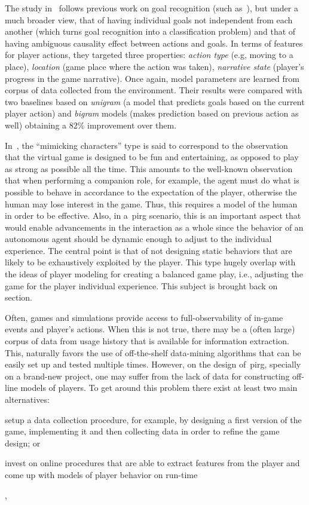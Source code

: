 The study in~\cite{ha_goal_2011} follows previous work on goal recognition (such as~\cite{mott_probabilistic_2006}), but under a much broader view, that of having individual goals not independent from each another (which turns goal recognition into a classification problem) and that of having ambiguous causality effect between actions and goals. In terms of features for player actions, they targeted three properties: \textit{action type} (e.g, moving to a place), \textit{location} (game place where the action was taken), \textit{narrative state} (player's progress in the game narrative).  Once again, model parameters are learned from corpus of data collected from the environment. Their results were compared with two baselines based on \textit{unigram} (a model that predicts goals based on the current player action) and \textit{bigram} models (makes prediction based on previous action as well) obtaining a 82\% improvement over them.

In~\cite{herik_opponent_2005}, the ``mimicking characters'' type is said to correspond to the observation that the virtual game is designed to be fun and entertaining, as opposed to play as strong as possible all the time. This amounts to the well-known observation that when performing a companion role, for example, the agent must do what is possible to behave in accordance to the expectation of the player, otherwise the human may lose interest in the game. Thus, this requires a model of the human in order to be effective. Also, in a~\gls{pirg} scenario, this is an important aspect that would enable advancements in the interaction as a whole since the behavior of an autonomous agent should be dynamic enough to adjust to the individual experience. The central point is that of not designing static behaviors that are likely to be exhaustively exploited by the player. This type hugely overlap with the ideas of player modeling for creating a balanced game play, i.e., adjusting the game for the player individual experience. This subject is brought back on section.  

Often, games and simulations provide access to full-observability of in-game events and player's actions. When this is not true, there may be a (often large) corpus of data from usage history that is available for information extraction. This, naturally favors the use of off-the-shelf data-mining algorithms that can be easily set up and tested multiple times. However, on the design of~\gls{pirg}, specially on a brand-new project, one may suffer from the lack of data for constructing off-line models of players. To get around this problem there exist at least two main alternatives: \begin{inparaenum}\item setup a data collection procedure, for example, by designing a first version of the game, implementing it and then collecting data in order to refine the game design; or \item invest on online procedures that are able to extract features from the player and come up with models of player behavior on run-time\end{inparaenum}, %

